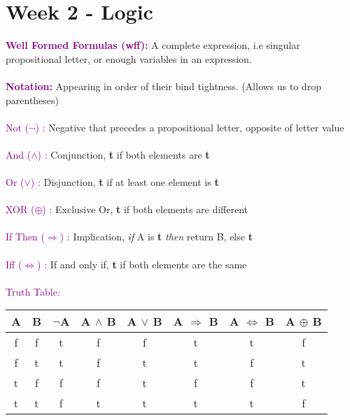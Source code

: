 \documentclass[a4paper,10pt]{article}
\begin{document}
\section*{Week 2 - Logic}
\textcolor{Purple}{\textbf{Well Formed Formulas (wff):}} A complete expression, i.e singular propositional letter, or enough variables in an expression. \\ \\
\textcolor{Purple}{\textbf{Notation:}} Appearing in order of their bind tightness. (Allows us to drop parentheses)\\ \\
\indent \textcolor{Purple}{Not ($\neg$) :} Negative that precedes a propositional letter, opposite of letter value\\ \\
\indent \textcolor{Purple}{And ($\land$) :} Conjunction, \textbf{t} if both elements are \textbf{t}\\ \\
\indent \textcolor{Purple}{Or ($\lor$) :} Disjunction, \textbf{t} if at least one element is \textbf{t} \\ \\
\indent \textcolor{Purple}{XOR ($\oplus$) :} Exclusive Or, \textbf{t} if both elements are different\\ \\
\indent \textcolor{Purple}{If Then ($\Rightarrow$) :} Implication, \emph{if} A is \textbf{t} \emph{then} return B, else \textbf{t} \\ \\
\indent \textcolor{Purple}{Iff ($\Leftrightarrow$) :} If and only if, \textbf{t} if both elements are the same\\ \\
\indent \textcolor{Purple}{Truth Table:}
\begin{center}
\begin{tabular}{|c | c || c | c | c | c | c | c| } 
\hline
A & B & $\neg$A & A $\land$ B & A $\lor$ B & A $\Rightarrow$ B & A $\Leftrightarrow$ B & A $\oplus$ B \\ 
\hline 
\hline
 f & f & t & f & f & t & t & f \\
 \hline 
 f & t & t & f & t & t & f & t \\
 \hline
 t & f & f & f & t & f & f & t \\ 
 \hline 
 t & t & f & t & t & t & t & f \\
 \hline 

\end{tabular}
\end{center}
\end{document}
